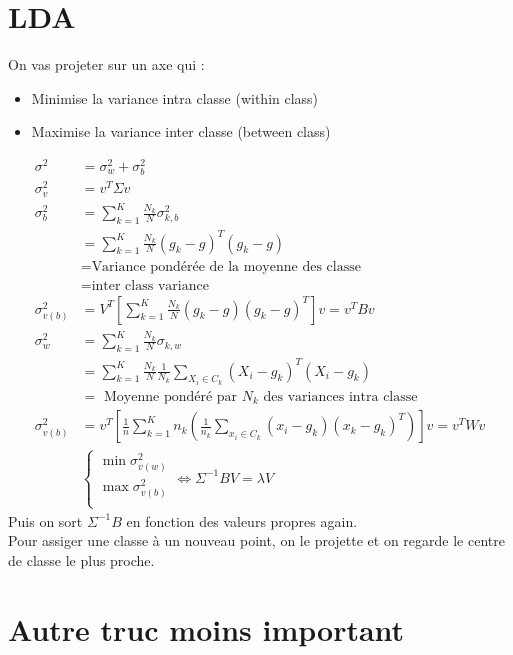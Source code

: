 \documentclass{article}
\theoremstyle{plain}%
\theoremstyle{definition}
\theoremstyle{remark}
\begin{document}
\section{LDA}
On vas projeter sur un axe qui : \begin{itemize}
    \item Minimise la variance intra classe (within class)
    \item Maximise la variance inter classe (between class)
\end{itemize}
\begin{align*}
    \sigma ^2 &= \sigma _w^2 + \sigma _b^2 \\
    \sigma _v^2 &= v^T \Sigma v \\
    \sigma _b^2 &= \sum_{k=1}^{K} \frac{N_k}{N}\sigma _{k,b}^2 \\
        &= \sum_{k=1}^{K}\frac{N_k}{N}(g_k - g)^T(g_k - g) \\
        &= \text{Variance pondérée de la moyenne des classe} \\
        &= \text{inter class variance} \\
    \sigma _{v(b)}^2 &= V^T [\sum_{k=1}^{K} \frac{N_k}{N} (g_k - g)(g_k -g)^T] v = v^T B v \\
    \sigma _w^2  &= \sum_{k=1}^{K} \frac{N_k}{N} \sigma _{k,w} \\
        &= \sum_{k=1}^{K} \frac{N_k}{N} \frac{1}{N_k} \sum_{X_i \in C_k} (X_i - g_k)^T (X_i - g_k) \\
        &= \text{ Moyenne pondéré par } N_k \text{ des variances intra classe} \\
    \sigma _{v(b)}^2 &= v^T [\frac{1}{n} \sum_{k=1}^{K} n_k (\frac{1}{n_k} \sum_{x_i \in C_k}^{} (x_i - g_k)(x_k - g_k)^T)] v = v^T W v \\
    & \begin{cases}
    \min \sigma _{v(w)}^2 \\
    \max \sigma _{v(b)}^2 \\
    \end{cases} \Leftrightarrow \Sigma ^{-1} B V = \lambda V
\end{align*}
Puis on sort $ \Sigma ^{-1}B $ en fonction des valeurs propres again. \\
Pour assiger une classe à un nouveau point, on le projette et on regarde le centre de classe le plus proche.


\section{Autre truc moins important}
\end{document}
